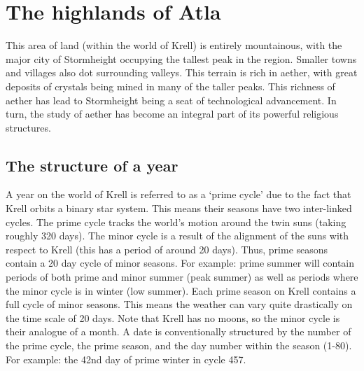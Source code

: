 \documentclass[a4paper,11pt,oneside]{book}
\newcommand{\textlf}[1]{\textbf{\titlecap{#1}}}
\begin{document}
%

\chapter{The highlands of Atla}
This area of land (within the world of Krell) is entirely mountainous, with the major city of Stormheight occupying the tallest peak in the region. Smaller towns and villages also dot surrounding valleys. This terrain is rich in aether, with great deposits of crystals being mined in many of the taller peaks. This richness of aether has lead to Stormheight being a seat of technological advancement. In turn, the study of aether has become an integral part of its powerful religious structures.  

\section{The structure of a year}
A year on the world of Krell is referred to as a `prime cycle' due to the fact that Krell orbits a binary star system. This means their seasons have two inter-linked cycles. The prime cycle tracks the world's motion around the twin suns (taking roughly 320 days). The minor cycle is a result of the alignment of the suns with respect to Krell (this has a period of around 20 days). Thus, prime seasons contain a 20 day cycle of minor seasons. For example: prime summer will contain periods of both prime and minor summer (peak summer) as well as periods where the minor cycle is in winter (low summer). Each prime season on Krell contains a full cycle of minor seasons. This means the weather can vary quite drastically on the time scale of 20 days. Note that Krell has no moons, so the minor cycle is their analogue of a month. A date is conventionally structured by the number of the prime cycle, the prime season, and the day number within the season (1-80). For example: the 42nd day of prime winter in cycle 457.
\end{document}
